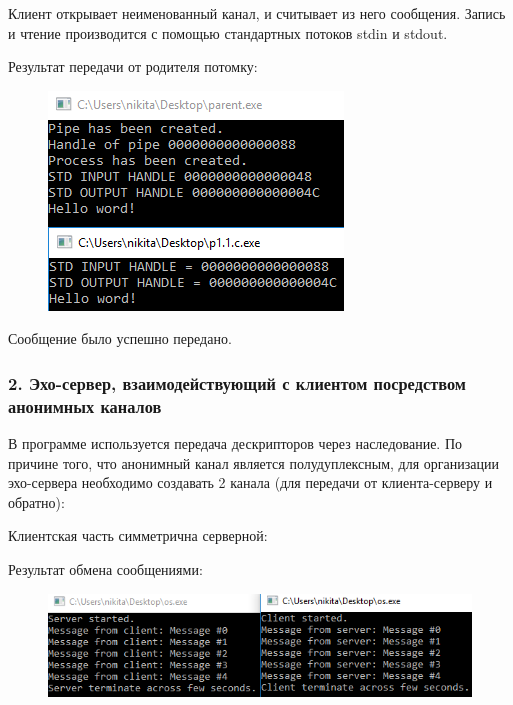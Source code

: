 \documentclass[14pt,a4paper,report]{report}
\begin{document}


Клиент открывает неименованный канал, и считывает из него сообщения. Запись и чтение производится с помощью стандартных потоков stdin и stdout.



Результат передачи от родителя потомку:

\begin{figure}[h!]
	\centering
	\includegraphics[scale = 1.05]{images/p1_1.png}
	
	\caption{}
	\label{image:2}
\end{figure}

Сообщение было успешно передано.

\subsubsection{2. Эхо-сервер, взаимодействующий с клиентом посредством анонимных каналов}

В программе используется передача дескрипторов через наследование. По причине того, что анонимный канал является полудуплексным, для организации эхо-сервера необходимо создавать 2 канала (для передачи от клиента-серверу и обратно):



Клиентская часть симметрична серверной:



\clearpage

Результат обмена сообщениями:

\begin{figure}[h!]
	\centering
	\includegraphics[scale = 1.05]{images/p1_2.png}
	
	\caption{}
	\label{image:3}
\end{figure}
\end{document}
